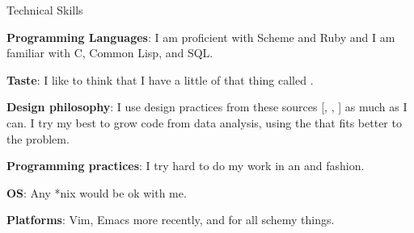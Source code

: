 \begin{rubric}{Technical Skills}{ 

    \entry* \textbf{Programming Languages}: I am proficient with
    Scheme and Ruby and I am familiar with C, Common Lisp, and SQL.
    
    \entry* \textbf{Taste}: I like to think that I have a little of that thing
    called .

    \entry* \textbf{Design philosophy}: I use design practices from
    these sources
    [,
     ,
     ]
    as much as I can. I try my best to grow code from data analysis,
    using the
    that fits better to the problem.

    \entry* \textbf{Programming practices}: I try hard to do my work in an
    and
    fashion.

    \entry* \textbf{OS}: Any *nix would be ok with me.

   \entry* \textbf{Platforms}: Vim, Emacs more recently, and
    for all schemy things.

}\end{rubric}
